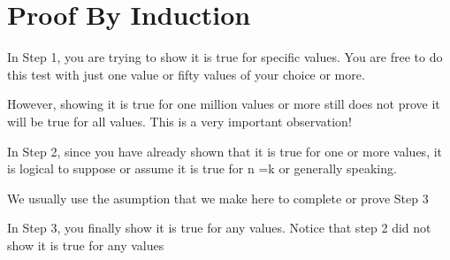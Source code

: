 		
		

\section{Proof By Induction}
In Step 1, you are trying to show it is true for specific values. You are free to do this test with just one value or fifty values of your choice or more.

However, showing it is true for one million values or more still does not prove it will be true for all values. This is a very important observation!

In Step 2, since you have already shown that it is true for one or more values, it is logical to suppose or assume it is true for n =k or generally speaking.

We usually use the asumption that we make here to complete or prove Step  3

In Step 3, you finally show it is true for any values. Notice that step 2 did not show it is true for any values
